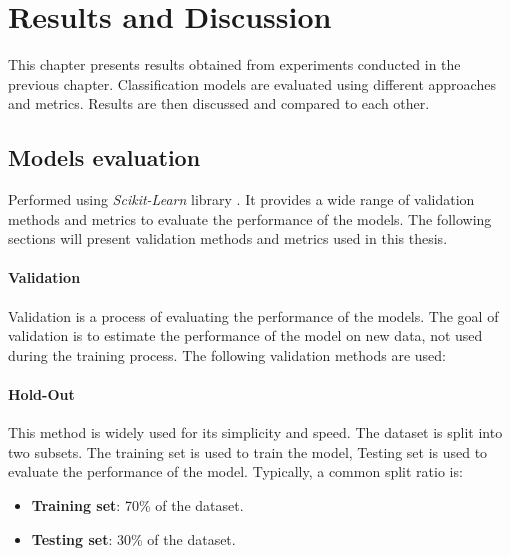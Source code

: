 \hypersetup{colorlinks=true, linkcolor=blue, citecolor=red}

\chapter{Results and Discussion} \label{chap:results_and_discussion}

    This chapter presents results obtained from experiments conducted in the previous chapter. Classification models are evaluated using different approaches and metrics. Results are then discussed and compared to each other.

    \section{Models evaluation}

        Performed using \textit{Scikit-Learn} library \cite{sklearn_api}. It provides a wide range of validation methods and metrics to evaluate the performance of the models. The following sections will present validation methods and metrics used in this thesis.

        \subsubsection{Validation}

            Validation is a process of evaluating the performance of the models. The goal of validation is to estimate the performance of the model on new data, not used during the training process. The following validation methods are used:

            \subsubsection{Hold-Out}

                This method is widely used for its simplicity and speed. The dataset is split into two subsets. The training set is used to train the model, Testing set is used to evaluate the performance of the model. Typically, a common split ratio is:
                \begin{itemize}
                    \item \textbf{Training set}: 70\% of the dataset.
                    \item \textbf{Testing set}: 30\% of the dataset.
                \end{itemize}
            
